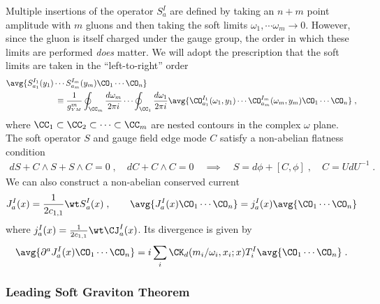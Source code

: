 \documentclass[11pt]{article}
\def\o{{\omega}}
\def\p{{\partial}}
\def\w{{\wedge}}
\def\ym{{\scriptscriptstyle YM}}
\begin{document}
Multiple insertions of the operator $S_a^{I}$ are defined by taking an $n+m$ point amplitude with $m$ gluons and then taking the soft limits $\o_1,\cdots \o_m\to0$. However, since the gluon is itself charged under the gauge group, the order in which these limits are performed \emph{does} matter. We will adopt the prescription that the soft limits are taken in the ``left-to-right'' order
\begin{equation}
\begin{split}\label{multsoftdef}
& \avg{ S_{a_1}^{I_1}(y_1)  \cdots S_{a_m}^{I_m}(y_m)  \CO_1 \cdots \CO_n } \\
&\qquad \qquad \qquad \equiv \frac{1}{g^m_\ym}\oint_{\CC_m} \frac{d\o_m}{2\pi i}  \cdots  \oint_{\CC_1} \frac{d\o_1}{2\pi i} \avg{  \CO^{I_1}_{a_1}(\o_1,y_1)  \cdots  \CO^{I_m}_{a_m}(\o_m,y_m)  \CO_1 \cdots \CO_n }  \; ,
\end{split}
\end{equation}
where $\CC_1 \subset \CC_2 \subset \cdots \subset \CC_m$ are nested contours in the complex $\omega$ plane. The soft operator $S$ and gauge field edge mode $C$ satisfy a non-abelian flatness condition
\begin{equation}
\begin{split}\label{NAflatcond}
d S + C \w S + S \w C  = 0 \; , \quad   d C + C \w C  = 0 \quad \implies \quad S = d \phi + [ C , \phi ] \; , \quad C = U d U^{-1}  \; . 
\end{split}
\end{equation}
We can also construct a non-abelian conserved current 
\begin{equation}
\begin{split}\label{eq:YMCurrentShadow}
J_a^I(x) = \frac{1}{2c_{1,1}} {\wt S}^I_a (x) \; , \qquad \avg{ J_a^I(x) \CO_1 \cdots \CO_n } = j^I_a(x) \avg{ \CO_1 \cdots \CO_n } 
\end{split}
\end{equation}
where $j^I_a(x) = \frac{1}{2c_{1,1}} {\wt \CJ}^I_a (x)$. Its divergence is given by
\begin{equation}
\begin{split}\label{eq:CurrentDiv-ym}
\avg{ \p^a J^I_a(x)\CO_1 \cdots \CO_n    } = i  \sum_i \CK_d(  m_i / \o_i , x_i ; x  )  T^I_i \avg{ \CO_1 \cdots \CO_n  } \; .
\end{split}
\end{equation}






\subsubsection*{Leading Soft Graviton Theorem}
\end{document}

